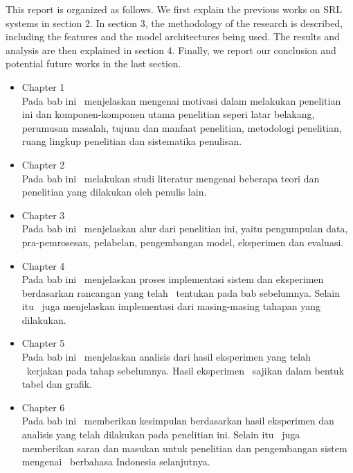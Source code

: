 This report is organized as follows. We first explain the previous works on SRL systems in section 2. In section 3, the methodology of the research is described, including the features and the model architectures being used. The results and analysis are then explained in section 4. Finally, we report our conclusion and potential future works in the last section.
\begin{itemize}

	\item Chapter 1 \babSatu \\
	Pada bab ini \saya~menjelaskan mengenai motivasi dalam melakukan penelitian ini dan komponen-komponen utama penelitian seperi latar belakang, perumusan masalah, tujuan dan manfaat penelitian, metodologi penelitian, ruang lingkup penelitian dan sistematika penulisan.
	
	\item Chapter 2 \babDua \\
	Pada bab ini \saya~melakukan studi literatur mengenai beberapa teori dan penelitian yang dilakukan oleh penulis lain. 
		
	\item Chapter 3 \babTiga \\
	Pada bab ini \saya~menjelaskan alur dari penelitian ini, yaitu pengumpulan data, pra-pemrosesan, pelabelan, pengembangan model, eksperimen dan evaluasi.
		
	\item Chapter 4 \babEmpat \\
	Pada bab ini \saya~menjelaskan proses implementasi sistem dan eksperimen berdasarkan rancangan yang telah \penulis~tentukan pada bab sebelumnya. Selain itu \saya~juga menjelaskan implementasi dari masing-masing tahapan yang dilakukan.
		
	\item Chapter 5 \babLima \\
	Pada bab ini \saya~menjelaskan analisis dari hasil eksperimen yang telah \saya~kerjakan pada tahap sebelumnya. Hasil eksperimen \saya~sajikan dalam bentuk tabel dan grafik.
	
	\item Chapter 6 \babEnam \\
	Pada bab ini \saya~memberikan kesimpulan berdasarkan hasil eksperimen dan analisis yang telah dilakukan pada penelitian ini. Selain itu \saya~juga memberikan saran dan masukan untuk penelitian dan pengembangan sistem mengenai \mer~berbahasa Indonesia selanjutnya.
	
\end{itemize}